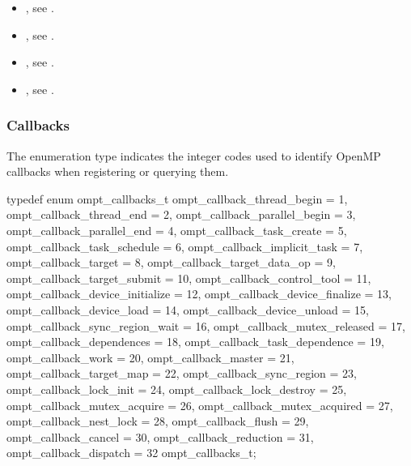 \crossreferences
\begin{itemize}
\item {}, see .

\item {}, see .

\item {}, see .

\item {}, see .
\end{itemize}

\subsubsection{Callbacks}
\label{sec:ompt_callbacks_t}

\summary
The  enumeration type indicates the integer codes 
used to identify OpenMP callbacks when registering or querying them.

\format
\begin{ccppspecific}
\begin{omptEnum}
typedef enum ompt_callbacks_t {
  ompt_callback_thread_begin             = 1,
  ompt_callback_thread_end               = 2,
  ompt_callback_parallel_begin           = 3,
  ompt_callback_parallel_end             = 4,
  ompt_callback_task_create              = 5,
  ompt_callback_task_schedule            = 6,
  ompt_callback_implicit_task            = 7,
  ompt_callback_target                   = 8,
  ompt_callback_target_data_op           = 9,
  ompt_callback_target_submit            = 10,
  ompt_callback_control_tool             = 11,
  ompt_callback_device_initialize        = 12,
  ompt_callback_device_finalize          = 13,
  ompt_callback_device_load              = 14,
  ompt_callback_device_unload            = 15,
  ompt_callback_sync_region_wait         = 16,
  ompt_callback_mutex_released           = 17,
  ompt_callback_dependences              = 18,
  ompt_callback_task_dependence          = 19,
  ompt_callback_work                     = 20,
  ompt_callback_master                   = 21,
  ompt_callback_target_map               = 22,
  ompt_callback_sync_region              = 23,
  ompt_callback_lock_init                = 24,
  ompt_callback_lock_destroy             = 25,
  ompt_callback_mutex_acquire            = 26,
  ompt_callback_mutex_acquired           = 27,
  ompt_callback_nest_lock                = 28,
  ompt_callback_flush                    = 29,
  ompt_callback_cancel                   = 30,
  ompt_callback_reduction                = 31,
  ompt_callback_dispatch                 = 32
} ompt_callbacks_t;
\end{omptEnum}
\end{ccppspecific}




